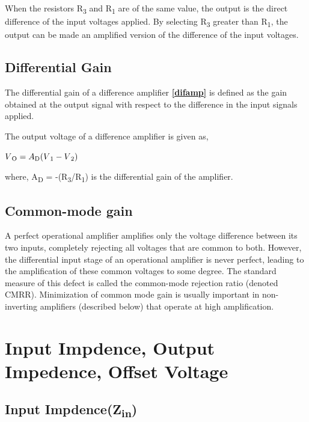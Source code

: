 \documentclass[11pt,a4paper,oneside]{article}
\begin{document}
When the resistors R\textsubscript{3} and R\textsubscript{1} are of the same value, the output is the direct difference of the input voltages applied. By selecting R\textsubscript{3} greater than R\textsubscript{1}, the output can be made an amplified version of the difference of the input voltages.

\subsection{Differential Gain}

The differential gain of a difference amplifier \textbf{\ref{difamp}} is defined as the gain obtained at the output signal with respect to the difference in the input signals applied.

The output voltage of a difference amplifier is given as,

\begin{center}
	$V\textsubscript{O} = A\textsubscript{D}(V\textsubscript{1} - V\textsubscript{2})$
\end{center}

where, A\textsubscript{D} = -(R\textsubscript{3}/R\textsubscript{1}) is the differential gain of the amplifier.

\subsection{Common-mode gain}

A perfect operational amplifier amplifies only the voltage difference between its two inputs, completely rejecting all voltages that are common to both. However, the differential input stage of an operational amplifier is never perfect, leading to the amplification of these common voltages to some degree. The standard measure of this defect is called the common-mode rejection ratio (denoted CMRR). Minimization of common mode gain is usually important in non-inverting amplifiers (described below) that operate at high amplification.

\clearpage

\section{Input Impdence, Output Impedence, Offset Voltage}

\subsection{Input Impdence(Z\textsubscript{in})}
\end{document}
